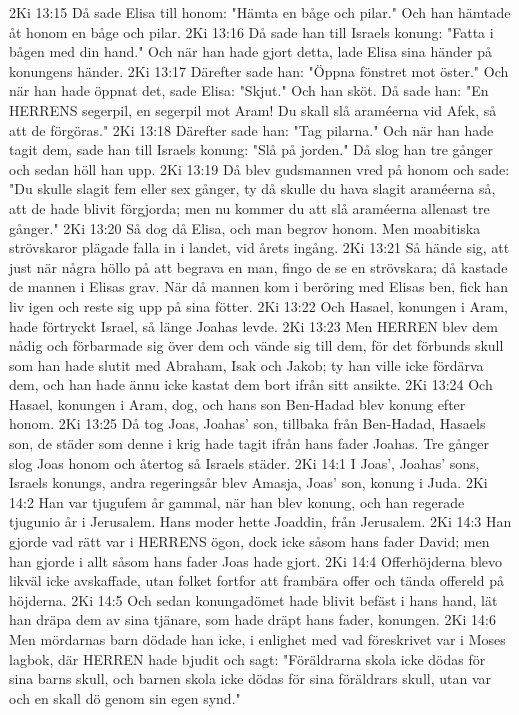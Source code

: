 2Ki 13:15  Då sade Elisa till honom: "Hämta en båge och pilar." Och han hämtade åt honom en båge och pilar.
2Ki 13:16  Då sade han till Israels konung: "Fatta i bågen med din hand." Och när han hade gjort detta, lade Elisa sina händer på konungens händer.
2Ki 13:17  Därefter sade han: "Öppna fönstret mot öster." Och när han hade öppnat det, sade Elisa: "Skjut." Och han sköt. Då sade han: "En HERRENS segerpil, en segerpil mot Aram! Du skall slå araméerna vid Afek, så att de förgöras."
2Ki 13:18  Därefter sade han: "Tag pilarna." Och när han hade tagit dem, sade han till Israels konung: "Slå på jorden." Då slog han tre gånger och sedan höll han upp.
2Ki 13:19  Då blev gudsmannen vred på honom och sade: "Du skulle slagit fem eller sex gånger, ty då skulle du hava slagit araméerna så, att de hade blivit förgjorda; men nu kommer du att slå araméerna allenast tre gånger."
2Ki 13:20  Så dog då Elisa, och man begrov honom. Men moabitiska strövskaror plägade falla in i landet, vid årets ingång.
2Ki 13:21  Så hände sig, att just när några höllo på att begrava en man, fingo de se en strövskara; då kastade de mannen i Elisas grav. När då mannen kom i beröring med Elisas ben, fick han liv igen och reste sig upp på sina fötter.
2Ki 13:22  Och Hasael, konungen i Aram, hade förtryckt Israel, så länge Joahas levde.
2Ki 13:23  Men HERREN blev dem nådig och förbarmade sig över dem och vände sig till dem, för det förbunds skull som han hade slutit med Abraham, Isak och Jakob; ty han ville icke fördärva dem, och han hade ännu icke kastat dem bort ifrån sitt ansikte.
2Ki 13:24  Och Hasael, konungen i Aram, dog, och hans son Ben-Hadad blev konung efter honom.
2Ki 13:25  Då tog Joas, Joahas' son, tillbaka från Ben-Hadad, Hasaels son, de städer som denne i krig hade tagit ifrån hans fader Joahas. Tre gånger slog Joas honom och återtog så Israels städer.
2Ki 14:1  I Joas', Joahas' sons, Israels konungs, andra regeringsår blev Amasja, Joas' son, konung i Juda.
2Ki 14:2  Han var tjugufem år gammal, när han blev konung, och han regerade tjugunio år i Jerusalem. Hans moder hette Joaddin, från Jerusalem.
2Ki 14:3  Han gjorde vad rätt var i HERRENS ögon, dock icke såsom hans fader David; men han gjorde i allt såsom hans fader Joas hade gjort.
2Ki 14:4  Offerhöjderna blevo likväl icke avskaffade, utan folket fortfor att frambära offer och tända offereld på höjderna.
2Ki 14:5  Och sedan konungadömet hade blivit befäst i hans hand, lät han dräpa dem av sina tjänare, som hade dräpt hans fader, konungen.
2Ki 14:6  Men mördarnas barn dödade han icke, i enlighet med vad föreskrivet var i Moses lagbok, där HERREN hade bjudit och sagt: "Föräldrarna skola icke dödas för sina barns skull, och barnen skola icke dödas för sina föräldrars skull, utan var och en skall dö genom sin egen synd."
